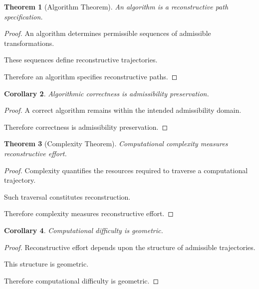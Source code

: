 \documentclass[12pt,oneside]{article}
\newtheorem{theorem}{Theorem}[section] \newtheorem{lemma}[theorem]{Lemma} \newtheorem{proposition}[theorem]{Proposition} \newtheorem{corollary}[theorem]{Corollary}
\theoremstyle{definition}
\begin{document}
\begin{theorem}[Algorithm Theorem]

An algorithm is a reconstructive path specification.

\end{theorem}

\begin{proof}

An algorithm determines permissible sequences of admissible transformations.

These sequences define reconstructive trajectories.

Therefore an algorithm specifies reconstructive paths.

\end{proof}

\begin{corollary}

Algorithmic correctness is admissibility preservation.

\end{corollary}

\begin{proof}

A correct algorithm remains within the intended admissibility domain.

Therefore correctness is admissibility preservation.

\end{proof}

\begin{theorem}[Complexity Theorem]

Computational complexity measures reconstructive effort.

\end{theorem}

\begin{proof}

Complexity quantifies the resources required to traverse a computational trajectory.

Such traversal constitutes reconstruction.

Therefore complexity measures reconstructive effort.

\end{proof}

\begin{corollary}

Computational difficulty is geometric.

\end{corollary}

\begin{proof}

Reconstructive effort depends upon the structure of admissible trajectories.

This structure is geometric.

Therefore computational difficulty is geometric.

\end{proof}
\end{document}
